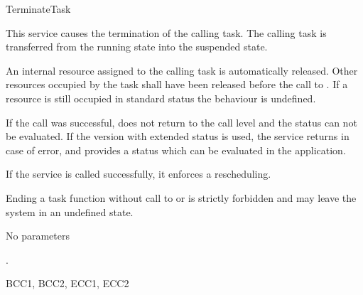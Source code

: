 \documentclass[12pt,a4paper,titlepage]{scrreprt}
\begin{document}
\begin{function}{TerminateTask}


  \begin{fundescription}
    This service causes the termination of the calling task. The
    calling task is transferred from the running state into the
    suspended state.

    An internal resource assigned to the calling task is automatically
    released. Other resources occupied by the task shall have been
    released before the call to . If a resource is
    still occupied in standard status the behaviour is undefined.

    If the call was successful,  does not return to
    the call level and the status can not be evaluated.  If the
    version with extended status is used, the service returns in case
    of error, and provides a status which can be evaluated in the
    application.

    If the service  is called successfully, it
    enforces a rescheduling.

    Ending a task function without call to  or
     is strictly forbidden and may leave the system in
    an undefined state.
  \end{fundescription}

  \begin{funparameters}
  \item No parameters
  \end{funparameters}

  \begin{funreturn}
    .
  \end{funreturn}

  \begin{funconformance}
    BCC1, BCC2, ECC1, ECC2
  \end{funconformance}
\end{function}


\end{document}
